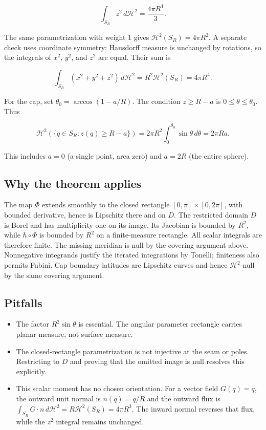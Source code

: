 \documentclass[
  11pt,
]{article}
\providecommand{\tightlist}{%
  \setlength{\itemsep}{0pt}\setlength{\parskip}{0pt}}
\begin{document}
\[
\boxed{\int_{S_R}z^2\,d\mathcal H^2=\frac{4\pi R^4}{3}}.
\]

The same parametrization with weight \(1\) gives
\(\mathcal H^2(S_R)=4\pi R^2\). A separate check uses coordinate
symmetry: Hausdorff measure is unchanged by rotations, so the integrals
of \(x^2\), \(y^2\), and \(z^2\) are equal. Their sum is

\[
\int_{S_R}(x^2+y^2+z^2)\,d\mathcal H^2
=R^2\mathcal H^2(S_R)=4\pi R^4.
\]

For the cap, set \(\theta_0=\arccos(1-a/R)\). The condition
\(z\geq R-a\) is \(0\leq\theta\leq\theta_0\). Thus

\[
\mathcal H^2(\{q\in S_R:z(q)\geq R-a\})
=2\pi R^2\int_0^{\theta_0}\sin\theta\,d\theta
=\boxed{2\pi Ra}.
\]

This includes \(a=0\) (a single point, area zero) and \(a=2R\) (the
entire sphere).

\subsection{Why the theorem applies}\label{why-the-theorem-applies-9}

The map \(\Phi\) extends smoothly to the closed rectangle
\([0,\pi]\times[0,2\pi]\), with bounded derivative, hence is Lipschitz
there and on \(D\). The restricted domain \(D\) is Borel and has
multiplicity one on its image. Its Jacobian is bounded by \(R^2\), while
\(h\circ\Phi\) is bounded by \(R^2\) on a finite-measure rectangle. All
scalar integrals are therefore finite. The missing meridian is null by
the covering argument above. Nonnegative integrands justify the iterated
integrations by Tonelli; finiteness also permits Fubini. Cap boundary
latitudes are Lipschitz curves and hence \(\mathcal H^2\)-null by the
same covering argument.

\subsection{Pitfalls}\label{pitfalls-9}

\begin{itemize}
\tightlist
\item
  The factor \(R^2\sin\theta\) is essential. The angular parameter
  rectangle carries planar measure, not surface measure.
\item
  The closed-rectangle parametrization is not injective at the seam or
  poles. Restricting to \(D\) and proving that the omitted image is null
  resolves this explicitly.
\item
  This scalar moment has no chosen orientation. For a vector field
  \(G(q)=q\), the outward unit normal is \(n(q)=q/R\) and the outward
  flux is
  \(\int_{S_R}G\cdot n\,d\mathcal H^2=R\mathcal H^2(S_R)=4\pi R^3\). The
  inward normal reverses that flux, while the \(z^2\) integral remains
  unchanged.
\end{itemize}
\end{document}
